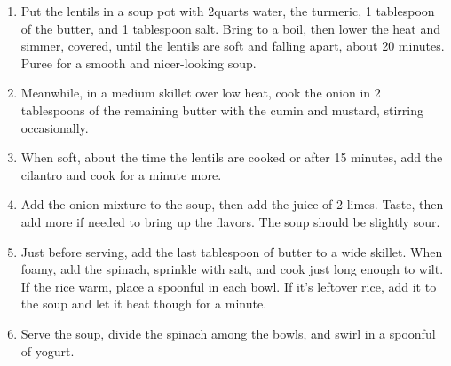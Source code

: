
\begin{ingredients}
\end{ingredients}


\begin{recipe}
  \begin{enumerate}

  \item Put the lentils in a soup pot with 2\fracH quarts water, the
    turmeric, 1 tablespoon of the butter, and 1 tablespoon salt.
    Bring to a boil, then lower the heat and simmer, covered, until
    the lentils are soft and falling apart, about 20 minutes.  Puree
    for a smooth and nicer-looking soup.

  \item Meanwhile, in a medium skillet over low heat, cook the onion
    in 2 tablespoons of the remaining butter with the cumin and
    mustard, stirring occasionally.

  \item When soft, about the time the lentils are cooked or after 15
    minutes, add the cilantro and cook for a minute more.

  \item Add the onion mixture to the soup, then add the juice of 2
    limes.  Taste, then add more if needed to bring up the flavors.
    The soup should be slightly sour.

  \item Just before serving, add the last tablespoon of butter to a
    wide skillet.  When foamy, add the spinach, sprinkle with salt,
    and cook just long enough to wilt.  If the rice warm, place a
    spoonful in each bowl.  If it's leftover rice, add it to the soup
    and let it heat though for a minute.

  \item Serve the soup, divide the spinach among the bowls, and swirl
    in a spoonful of yogurt.

  \end{enumerate}
\end{recipe}
